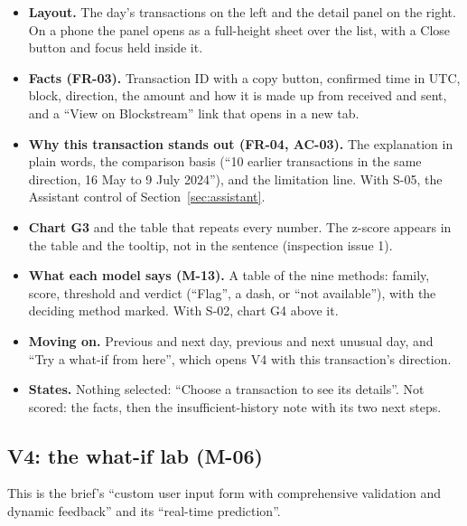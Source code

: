 \begin{itemize}
  \item \textbf{Layout.} The day's transactions on the left and the detail panel on the right. On
    a phone the panel opens as a full-height sheet over the list, with a Close button and focus held
    inside it.
  \item \textbf{Facts (FR-03).} Transaction ID with a copy button, confirmed time in UTC, block,
    direction, the amount and how it is made up from received and sent, and a ``View on
    Blockstream'' link that opens in a new tab.
  \item \textbf{Why this transaction stands out (FR-04, AC-03).} The explanation in plain words,
    the comparison basis (``10 earlier transactions in the same direction, 16 May to 9 July 2024''),
    and the limitation line. With S-05, the Assistant control of Section~\ref{sec:assistant}.
  \item \textbf{Chart G3} and the table that repeats every number. The z-score appears in the
    table and the tooltip, not in the sentence (inspection issue 1).
  \item \textbf{What each model says (M-13).} A table of the nine methods: family, score,
    threshold and verdict (``Flag'', a dash, or ``not available''), with the deciding method
    marked. With S-02, chart G4 above it.
  \item \textbf{Moving on.} Previous and next day, previous and next unusual day, and ``Try a
    what-if from here'', which opens V4 with this transaction's direction.
  \item \textbf{States.} Nothing selected: ``Choose a transaction to see its details''. Not
    scored: the facts, then the insufficient-history note with its two next steps.
\end{itemize}

\subsection{V4: the what-if lab (M-06)}
\label{sec:viewwhatif}

This is the brief's ``custom user input form with comprehensive validation and dynamic feedback''
and its ``real-time prediction''.

